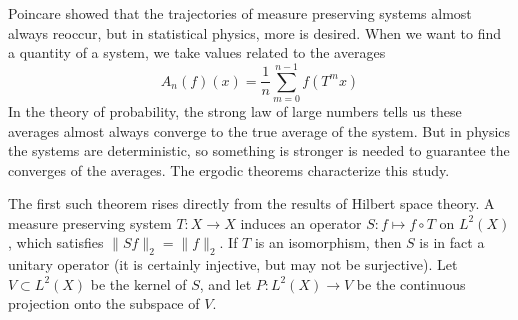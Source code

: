 Poincare showed that the trajectories of measure preserving systems almost always reoccur, but in statistical physics, more is desired. When we want to find a quantity of a system, we take values related to the averages
%
\[ A_n(f)(x) = \frac{1}{n} \sum_{m = 0}^{n-1} f(T^m x) \]
%
In the theory of probability, the strong law of large numbers tells us these averages almost always converge to the true average of the system. But in physics the systems are deterministic, so something is stronger is needed to guarantee the converges of the averages. The ergodic theorems characterize this study.

The first such theorem rises directly from the results of Hilbert space theory. A measure preserving system $T:X \to X$ induces an operator $S: f \mapsto f \circ T$ on $L^2(X)$, which satisfies $\|Sf\|_2 = \| f \|_2$. If $T$ is an isomorphism, then $S$ is in fact a unitary operator (it is certainly injective, but may not be surjective). Let $V \subset L^2(X)$ be the kernel of $S$, and let $P: L^2(X) \to V$ be the continuous projection onto the subspace of $V$.

